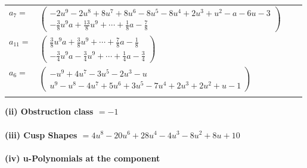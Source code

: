 \documentclass[1p]{elsarticle_modified}
\theoremstyle{definition}
\begin{document}
\begin{tabular}{m{7pt} m{180pt} m{7pt} m{180pt} }
\flushright $a_{7}=$&$\begin{pmatrix}-2 u^9-2 u^8+8 u^7+8 u^6-8 u^5-8 u^4+2 u^3+u^2- a-6 u-3\\-\frac{3}{8} u^9 a+\frac{13}{8} u^9+\cdots+\frac{1}{8} a-\frac{7}{8}\end{pmatrix}$ \\
\flushright $a_{11}=$&$\begin{pmatrix}\frac{3}{8} u^9 a+\frac{3}{8} u^9+\cdots+\frac{7}{8} a-\frac{1}{8}\\-\frac{3}{4} u^9 a-\frac{3}{4} u^9+\cdots+\frac{1}{4} a-\frac{3}{4}\end{pmatrix}$ \\
\flushright $a_{6}=$&$\begin{pmatrix}- u^9+4 u^7-3 u^5-2 u^3- u\\u^9- u^8-4 u^7+5 u^6+3 u^5-7 u^4+2 u^3+2 u^2+u-1\end{pmatrix}$\\&\end{tabular}
\flushleft \textbf{(ii) Obstruction class $= -1$}\\~\\
\flushleft \textbf{(iii) Cusp Shapes $= 4 u^8-20 u^6+28 u^4-4 u^3-8 u^2+8 u+10$}\\~\\
\newpage\renewcommand{\arraystretch}{1}
\flushleft \textbf{(iv) u-Polynomials at the component}\newline \\
\end{document}
